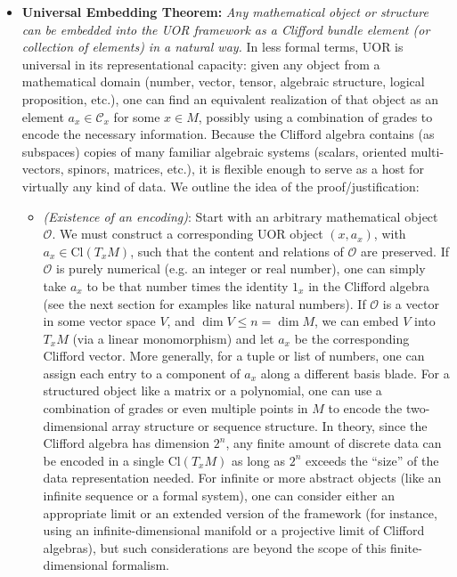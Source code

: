 \documentclass[12pt]{article}
\newcommand{\Cl}{\mathrm{Cl}}
\begin{document}
\begin{itemize}
    \item \textbf{Universal Embedding Theorem:} \emph{Any mathematical object or structure can be embedded into the UOR framework as a Clifford bundle element (or collection of elements) in a natural way.}  In less formal terms, UOR is universal in its representational capacity: given any object from a mathematical domain (number, vector, tensor, algebraic structure, logical proposition, etc.), one can find an equivalent realization of that object as an element $a_x \in \mathcal{C}_x$ for some $x \in M$, possibly using a combination of grades to encode the necessary information. Because the Clifford algebra contains (as subspaces) copies of many familiar algebraic systems (scalars, oriented multi-vectors, spinors, matrices, etc.), it is flexible enough to serve as a host for virtually any kind of data. We outline the idea of the proof/justification:
    \begin{itemize}
       \item \textit{(Existence of an encoding)}: Start with an arbitrary mathematical object $\mathcal{O}$. We must construct a corresponding UOR object $(x, a_x)$, with $a_x \in \Cl(T_xM)$, such that the content and relations of $\mathcal{O}$ are preserved. If $\mathcal{O}$ is purely numerical (e.g. an integer or real number), one can simply take $a_x$ to be that number times the identity $1_x$ in the Clifford algebra (see the next section for examples like natural numbers). If $\mathcal{O}$ is a vector in some vector space $V$, and $\dim V \le n = \dim M$, we can embed $V$ into $T_xM$ (via a linear monomorphism) and let $a_x$ be the corresponding Clifford vector. More generally, for a tuple or list of numbers, one can assign each entry to a component of $a_x$ along a different basis blade. For a structured object like a matrix or a polynomial, one can use a combination of grades or even multiple points in $M$ to encode the two-dimensional array structure or sequence structure. In theory, since the Clifford algebra has dimension $2^n$, any finite amount of discrete data can be encoded in a single $\Cl(T_xM)$ as long as $2^n$ exceeds the “size” of the data representation needed. For infinite or more abstract objects (like an infinite sequence or a formal system), one can consider either an appropriate limit or an extended version of the framework (for instance, using an infinite-dimensional manifold or a projective limit of Clifford algebras), but such considerations are beyond the scope of this finite-dimensional formalism.

\end{itemize}
\end{itemize}
\end{document}
